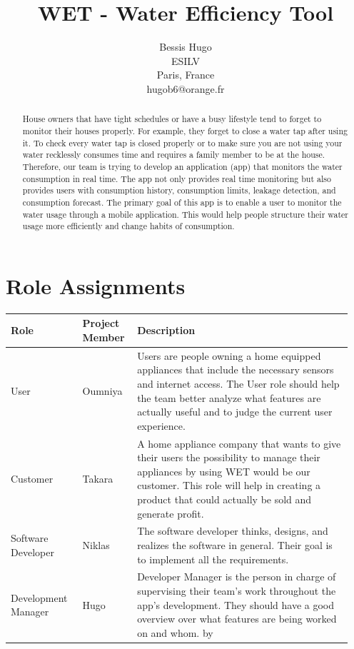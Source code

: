 \documentclass[10pt]{article}
\title{WET - Water Efficiency Tool }
\author{Bessis Hugo\\
ESILV\\
Paris, France\\
hugob6@orange.fr}
\date{}
\begin{document}
\maketitle


\begin{abstract}
House owners that have tight schedules or have a busy lifestyle tend to forget to monitor their houses properly. For example, they forget to close a water tap after using it. To check every water tap is closed properly or to make sure you are not using your water recklessly consumes time and requires a family member to be at the house. Therefore, our team is trying to develop an application (app) that monitors the water consumption in real time. The app not only provides real time monitoring but also provides users with consumption history, consumption limits, leakage detection, and consumption forecast. The primary goal of this app is to enable a user to monitor the water usage through a mobile application. This would help people structure their water usage more efficiently and change habits of consumption.
\end{abstract}

\section{Role Assignments}

\begin{table}[!ht]
\centering
\begin{tabular}{| p{0.2\linewidth} | p{0.15\linewidth} | p{0.6\linewidth} |}
\hline
Role & Project Member & Description \\
\hline
User & Oumniya & Users are people owning a home equipped appliances that include the necessary sensors and internet access. The User role should help the team better analyze what features are actually useful and to judge the current user experience. \\
\hline
Customer & Takara & A home appliance company that wants to give their users the possibility to manage their appliances by using WET would be our customer. This role will help in creating a product that could actually be sold and generate profit. \\
\hline
Software Developer & Niklas & The software developer thinks, designs, and realizes the software in general. Their goal is to implement all the requirements. \\
\hline
Development Manager & Hugo & Developer Manager is the person in charge of supervising their team's work throughout the app's development. They should have a good overview over what features are being worked on and whom. by \\
\hline
\end{tabular}
\end{table}
\end{document}

